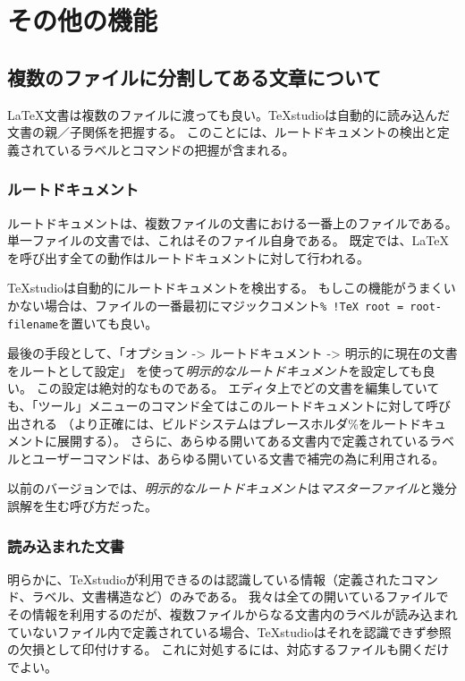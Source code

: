 \chapter{その他の機能}

\section{複数のファイルに分割してある文章について}

LaTeX文書は複数のファイルに渡っても良い。TeXstudioは自動的に読み込んだ文書の親／子関係を把握する。
このことには、ルートドキュメントの検出と定義されているラベルとコマンドの把握が含まれる。

\subsection{ルートドキュメント}

ルートドキュメントは、複数ファイルの文書における一番上のファイルである。
単一ファイルの文書では、これはそのファイル自身である。
既定では、LaTeXを呼び出す全ての動作はルートドキュメントに対して行われる。

TeXstudioは自動的にルートドキュメントを検出する。
もしこの機能がうまくいかない場合は、ファイルの一番最初にマジックコメント\verb+% !TeX root = root-filename+を置いても良い。

最後の手段として、「オプション -\textgreater{} ルートドキュメント -\textgreater{} 明示的に現在の文書をルートとして設定」
を使って\emph{明示的なルートドキュメント}を設定しても良い。
この設定は絶対的なものである。
エディタ上でどの文書を編集していても、「ツール」メニューのコマンド全てはこのルートドキュメントに対して呼び出される
（より正確には、ビルドシステムはプレースホルダ\%をルートドキュメントに展開する）。
さらに、あらゆる開いてある文書内で定義されているラベルとユーザーコマンドは、あらゆる開いている文書で補完の為に利用される。

以前のバージョンでは、\emph{明示的なルートドキュメント}は\emph{マスターファイル}と幾分誤解を生む呼び方だった。

\subsection{読み込まれた文書}

明らかに、TeXstudioが利用できるのは認識している情報（定義されたコマンド、ラベル、文書構造など）のみである。
我々は全ての開いているファイルでその情報を利用するのだが、複数ファイルからなる文書内のラベルが読み込まれていないファイル内で定義されている場合、TeXstudioはそれを認識できず参照の欠損として印付けする。
これに対処するには、対応するファイルも開くだけでよい。

